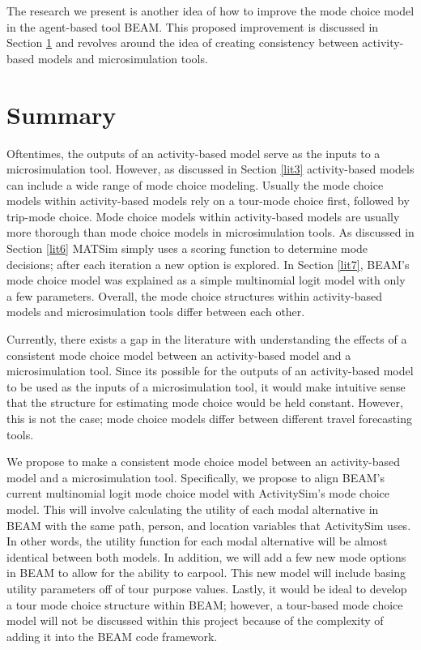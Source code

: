 \documentclass[12pt, oneside, openright]{byuthesis}
\begin{document}
The research we present is another idea of how to improve the mode choice model in the agent-based tool BEAM. This proposed improvement is discussed in Section \ref{lit9} and revolves around the idea of creating consistency between activity-based models and microsimulation tools.

\hypertarget{lit9}{%
\section{Summary}\label{lit9}}

Oftentimes, the outputs of an activity-based model serve as the inputs to a microsimulation tool. However, as discussed in Section \ref{lit3} activity-based models can include a wide range of mode choice modeling. Usually the mode choice models within activity-based models rely on a tour-mode choice first, followed by trip-mode choice. Mode choice models within activity-based models are usually more thorough than mode choice models in microsimulation tools. As discussed in Section \ref{lit6} MATSim simply uses a scoring function to determine mode decisions; after each iteration a new option is explored. In Section \ref{lit7}, BEAM's mode choice model was explained as a simple multinomial logit model with only a few parameters. Overall, the mode choice structures within activity-based models and microsimulation tools differ between each other.

Currently, there exists a gap in the literature with understanding the effects of a consistent mode choice model between an activity-based model and a microsimulation tool. Since its possible for the outputs of an activity-based model to be used as the inputs of a microsimulation tool, it would make intuitive sense that the structure for estimating mode choice would be held constant. However, this is not the case; mode choice models differ between different travel forecasting tools.

We propose to make a consistent mode choice model between an activity-based model and a microsimulation tool. Specifically, we propose to align BEAM's current multinomial logit mode choice model with ActivitySim's mode choice model. This will involve calculating the utility of each modal alternative in BEAM with the same path, person, and location variables that ActivitySim uses. In other words, the utility function for each modal alternative will be almost identical between both models. In addition, we will add a few new mode options in BEAM to allow for the ability to carpool. This new model will include basing utility parameters off of tour purpose values. Lastly, it would be ideal to develop a tour mode choice structure within BEAM; however, a tour-based mode choice model will not be discussed within this project because of the complexity of adding it into the BEAM code framework.
\end{document}

